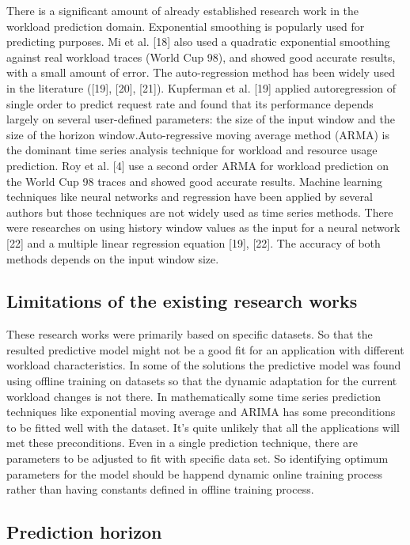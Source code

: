 There is a significant amount of already established research work in the workload prediction domain. Exponential smoothing is popularly used for predicting purposes. Mi et al. [18] also used a quadratic exponential smoothing against real workload traces (World Cup 98), and showed good accurate results, with a small amount of error. The auto-regression method has been widely used in the literature ([19], [20], [21]). Kupferman et al. [19] applied autoregression of single order to predict request rate and found that its performance depends largely on several user-defined parameters: the size of the input window and the size of the horizon window.Auto-regressive moving average method (ARMA) is the dominant time series analysis technique for workload and resource usage prediction. Roy et al. [4] use a second order ARMA for workload prediction on the World Cup 98 traces and showed good accurate results. Machine learning techniques like neural networks and regression have been applied by several authors but those techniques are not widely used as time series methods. There were researches on using history window values as the input for a neural network [22] and a multiple linear regression equation [19], [22]. The accuracy of both methods depends on the input window size.


\subsection{Limitations of the existing research works}

 These research works were primarily based on specific datasets. So that the resulted predictive model might not be a good fit for an application with different workload characteristics. In some of the solutions the predictive model was found using offline training on datasets so that the dynamic adaptation for the current workload changes is not there. 
In mathematically some time series prediction techniques like exponential moving average and ARIMA has some preconditions to be fitted well with the dataset. It’s quite unlikely that all the applications will met these preconditions. Even in a single prediction technique, there are parameters to be adjusted to fit with specific data set. So identifying optimum parameters for the model should be happend dynamic online training process rather than having constants defined in offline training process.

\subsection{Prediction horizon}


